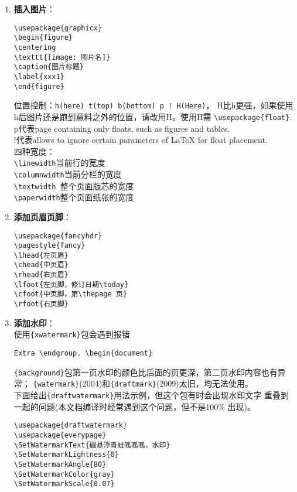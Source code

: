 \documentclass{article}
\newcommand{\q}{\quad}
\renewcommand{\today}{\number\year-\number\month-\number\day}
\begin{document}
\begin{multicols}{2}
\begin{enumerate}
\item \textbf{插入图片}：
\begin{lstlisting}
\usepackage{graphicx}    
\begin{figure}
\centering
\texttt{[image: 图片名]}
\caption{图片标题}
\label{xxx1}
\end{figure} 
\end{lstlisting} 
位置控制：\verb|h(here) t(top) b(bottom) p ! H(Here)|，
H比h更强，如果使用h后图片还是跑到意料之外的位置，请改用H。使用H需
\verb|\usepackage{float}|.  \\
p代表page containing only floats, such as figures and tables. \\
!代表allows to ignore certain parameters of LaTeX for float placement.\\
四种宽度：\\
\verb|\linewidth|\q\q 当前行的宽度 \\
\verb|\columnwidth|\q 当前分栏的宽度 \\
\verb|\textwidth|\q\q\ 整个页面版芯的宽度 \\
\verb|\paperwidth|\q\q 整个页面纸张的宽度


\item \textbf{添加页眉页脚}：
\begin{lstlisting}
\usepackage{fancyhdr}
\pagestyle{fancy}
\lhead{左页眉}
\chead{中页眉}
\rhead{右页眉}
\lfoot{左页脚，修订日期\today}
\cfoot{中页脚，第\thepage 页}
\rfoot{右页脚}
\end{lstlisting} 

\item \textbf{添加水印}：\\
使用\verb|{xwatermark}|包会遇到报错
\begin{lstlisting}
Extra \endgroup. \begin{document}
\end{lstlisting} 
\verb|{background}|包第一页水印的颜色比后面的页更深，第二页水印内容也有异常；
\verb|{watermark}|(2004)和\verb|{draftmark}|(2009)太旧，均无法使用。\\
下面给出\verb|{draftwatermark}|用法示例，但这个包有时会出现水印文字
重叠到一起的问题(本文档编译时经常遇到这个问题，但不是100\% 出现)。
\begin{lstlisting}
\usepackage{draftwatermark}
\usepackage{everypage}
\SetWatermarkText{磁悬浮青蛙呱呱呱，水印}
\SetWatermarkLightness{0}
\SetWatermarkAngle{80}
\SetWatermarkColor{gray}
\SetWatermarkScale{0.07}
\end{lstlisting} 


\end{enumerate}
\end{multicols}
\end{document}
